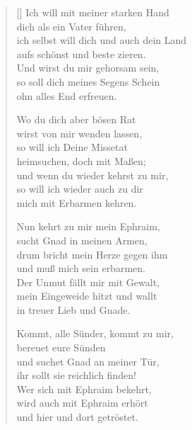 \begin{multicols}{2}
\begin{verse}[\versewidth]
 Ich will mit meiner starken Hand\\
dich als ein Vater führen,\\
ich selbst will dich und auch dein Land\\
aufs schönst und beste zieren.\\
Und wirst du mir gehorsam sein,\\
so soll dich meines Segens Schein\\
ohn alles End erfreuen.

 Wo du dich aber bösen Rat\\
wirst von mir wenden lassen,\\
so will ich Deine Missetat\\
heimsuchen, doch mit Maßen;\\
und wenn du wieder kehrst zu mir,\\
so will ich wieder auch zu dir\\
mich mit Erbarmen kehren.

 Nun kehrt zu mir mein Ephraim,\\
sucht Gnad in meinen Armen,\\
drum bricht mein Herze gegen ihm\\
und muß mich sein erbarmen.\\
Der Unmut fällt mir mit Gewalt,\\
mein Eingeweide hitzt und wallt\\
in treuer Lieb und Gnade.

 Kommt, alle Sünder, kommt zu mir,\\
bereuet eure Sünden\\
und suchet Gnad an meiner Tür,\\
ihr sollt sie reichlich finden!\\
Wer sich mit Ephraim bekehrt,\\
wird auch mit Ephraim erhört\\
und hier und dort getröstet.

\end{verse}
\end{multicols}
